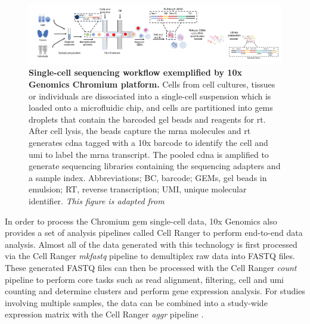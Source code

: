 \begin{figure}[t]
    \centering
    \includegraphics[width=\linewidth]{Chapter1/Fig/F1-5-03.png}
    \caption[Single-cell sequencing with 10x Genomics Chromium]{\textbf{Single-cell sequencing workflow exemplified by 10x Genomics Chromium platform.} Cells from cell cultures, tissues or individuals are dissociated into a single-cell suspension which is loaded onto a microfluidic chip, and cells are partitioned into \glspl{gem} droplets that contain the barcoded gel beads and reagents for \gls{rt}. After cell lysis, the beads capture the \gls{mrna} molecules and \gls{rt} generates \gls{cdna} tagged with a 10x barcode to identify the cell and \gls{umi} to label the \gls{mrna} transcript. The pooled \gls{cdna} is amplified to generate sequencing libraries containing the sequencing adapters and a sample index. Abbreviations; BC, barcode; GEMs, gel beads in emulsion; RT, reverse transcription; UMI, unique molecular identifier. \textit{This figure is adapted from \textbf{\cite{swaminath_use_2024}}}}
    \label{fig:chp1_10xgenomics}
\end{figure}

In order to process the Chromium \gls{gem} single-cell data, 10x Genomics also provides a set of analysis pipelines called Cell Ranger to perform end-to-end data analysis. Almost all of the data generated with this technology is first processed via the Cell Ranger \textit{mkfastq} pipeline to demultiplex raw data into FASTQ files. These generated FASTQ files can then be processed with the Cell Ranger \textit{count} pipeline to perform core tasks such as read alignment, filtering, cell and \gls{umi} counting and determine clusters and perform gene expression analysis. For studies involving multiple samples, the data can be combined into a study-wide expression matrix with the Cell Ranger \textit{aggr} pipeline \textbf{\cite{noauthor_what_nodate}}. 


